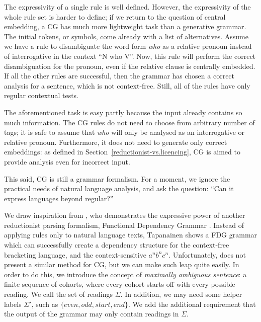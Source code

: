 The expressivity of a single rule is well defined. However, the expressivity of the whole rule set is harder to define; if we return to the question of central embedding, a CG has much more lightweight task than a generative grammar. The initial tokens, or symbols, come already with a list of alternatives.
Assume we have a rule to disambiguate the word form \emph{who} as a relative pronoun instead of interrogative in the context ``N who V''. %
Now, this rule will perform the correct disambiguation for the pronoun, even if the relative clause is centrally embedded. If all the other rules are successful, then the grammar has chosen a correct analysis for a sentence, which is not context-free. Still, 
all of the rules have only regular contextual tests.

The aforementioned task is easy partly because the input already contains so much information. The CG rules do not need to choose from arbitrary number of tags; it is safe to assume that \emph{who} will only be analysed as an interrogative or  relative pronoun. Furthermore, it does not need to generate only correct embeddings: as defined in Section~\ref{reductionist-vs.licencing}, CG is aimed to provide analysis even for incorrect input.

This said, CG is still a grammar formalism. For a moment, we ignore the practical needs of natural language analysis, and ask the question: ``Can it express languages beyond regular?'' 

We draw inspiration from \cite{tapanainen1999phd}, who demonstrates the expressive power of another reductionist parsing formalism, Functional Dependency Grammar .
Instead of applying rules only to natural language texts, Tapanainen shows a FDG grammar which can successfully create a dependency structure for the context-free bracketing language, and the context-sensitive $a^nb^nc^n$. 
Unfortunately, \cite{tapanainen1999phd} does not present a similar method for CG, but we can make such leap quite easily. In order to do this, we introduce the concept of \emph{maximally ambiguous sentence}: a finite sequence of cohorts, where every cohort starts off with every possible reading. We call the set of readings $\Sigma$. In addition, we may need some helper labels $\Sigma'$, such as $\{even, odd, start, end\}$. We add the additional requirement that the output of the grammar may only contain readings in $\Sigma$.

